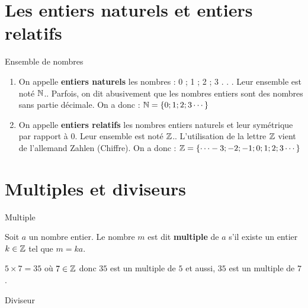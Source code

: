 \begin{pageCours}


\section{Les entiers naturels et entiers relatifs}

\begin{DefT}{Ensemble de nombres}

\begin{enumerate}
\item On appelle \textbf{entiers naturels} les nombres : 0 ; 1 ; 2 ; 3 . . . Leur ensemble est noté $\mathbb N$.. Parfois, on dit abusivement que les nombres entiers sont des nombres sans partie décimale.
On a donc : $\mathbb N =  \lbrace 0 ; 1 ; 2 ; 3 \cdots \rbrace $
\item  On appelle \textbf{entiers relatifs} les nombres entiers naturels et leur symétrique par rapport à 0. Leur ensemble est noté $\mathbb Z$.. L'utilisation de la lettre $\mathbb Z$ vient de l'allemand Zahlen (Chiffre).
On a donc : $\mathbb Z = \lbrace \cdots -3 ; -2 ; -1 ; 0 ; 1 ; 2 ; 3  \cdots  \rbrace$
\end{enumerate}
\end{DefT}

 
\section{Multiples et diviseurs}

\begin{minipage}{0.5\linewidth}

\begin{DefT}{Multiple}

Soit $a$ un nombre entier. Le nombre $m$ est dit \textbf{multiple} de $a$ s'il existe un entier $k \in \mathbb Z$ tel que $m=ka$.
\end{DefT}
\end{minipage}
\begin{minipage}{0.5\linewidth}
\begin{Ex} 

$5 \times 7 = 35$ où $7 \in \mathbb Z$ donc $35$ est un multiple de $5$ et aussi,  $35$ est un multiple de $7$.
\end{Ex}
\end{minipage}


\begin{minipage}{0.5\linewidth}
\begin{DefT}{Diviseur}


\end{DefT}
\end{minipage}
\end{pageCours}
